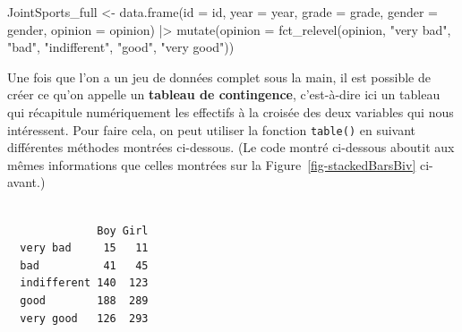 \documentclass[
  letterpaper,
]{book}
\newenvironment{Shaded}{\begin{snugshade}}{\end{snugshade}}
\newcommand{\AttributeTok}[1]{\textcolor[rgb]{0.40,0.45,0.13}{#1}}
\newcommand{\CommentTok}[1]{\textcolor[rgb]{0.37,0.37,0.37}{#1}}
\newcommand{\FunctionTok}[1]{\textcolor[rgb]{0.28,0.35,0.67}{#1}}
\newcommand{\NormalTok}[1]{\textcolor[rgb]{0.00,0.23,0.31}{#1}}
\newcommand{\OtherTok}[1]{\textcolor[rgb]{0.00,0.23,0.31}{#1}}
\newcommand{\SpecialCharTok}[1]{\textcolor[rgb]{0.37,0.37,0.37}{#1}}
\newcommand{\StringTok}[1]{\textcolor[rgb]{0.13,0.47,0.30}{#1}}
\begin{document}
\begin{Shaded}
\begin{Highlighting}[]
\NormalTok{JointSports\_full }\OtherTok{\textless{}{-}} 
  \FunctionTok{data.frame}\NormalTok{(}\AttributeTok{id =}\NormalTok{ id, }
             \AttributeTok{year =}\NormalTok{ year, }
             \AttributeTok{grade =}\NormalTok{ grade, }
             \AttributeTok{gender =}\NormalTok{ gender, }
             \AttributeTok{opinion =}\NormalTok{ opinion) }\SpecialCharTok{|\textgreater{}}
  \FunctionTok{mutate}\NormalTok{(}\AttributeTok{opinion =} \FunctionTok{fct\_relevel}\NormalTok{(opinion, }
                               \StringTok{"very bad"}\NormalTok{, }
                               \StringTok{"bad"}\NormalTok{, }
                               \StringTok{"indifferent"}\NormalTok{, }
                               \StringTok{"good"}\NormalTok{, }
                               \StringTok{"very good"}\NormalTok{))}
\end{Highlighting}
\end{Shaded}

Une fois que l'on a un jeu de données complet sous la main, il est
possible de créer ce qu'on appelle un \textbf{tableau de contingence},
c'est-à-dire ici un tableau qui récapitule numériquement les effectifs à
la croisée des deux variables qui nous intéressent. Pour faire cela, on
peut utiliser la fonction \texttt{table()} en suivant différentes
méthodes montrées ci-dessous. (Le code montré ci-dessous aboutit aux
mêmes informations que celles montrées sur la
Figure~\ref{fig-stackedBarsBiv} ci-avant.)

\begin{Shaded}
\end{Shaded}

\begin{verbatim}
             
              Boy Girl
  very bad     15   11
  bad          41   45
  indifferent 140  123
  good        188  289
  very good   126  293
\end{verbatim}
\end{document}
